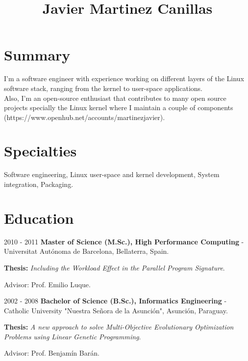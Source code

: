 \documentclass{simplecv}
\begin{document}

\title{Javier Martinez Canillas}

\maketitle

\section{Summary}

I'm a software engineer with experience working on different layers of the Linux software stack,
ranging from the kernel to user-space applications.\\

Also, I'm an open-source enthusiast that contributes to many open source projects specially the
Linux kernel where I maintain a couple of components (https://www.openhub.net/accounts/martinezjavier).

\section{Specialties}

Software engineering, Linux user-space and kernel development, System integration, Packaging.

\section{Education}

\begin{topic}

\item[2010 - 2011] {\bf Master of Science (M.Sc.), High Performance Computing} - Universitat Autónoma de Barcelona, Bellaterra, Spain. 

{\bf Thesis:} \emph{Including the Workload Effect in the Parallel Program Signature}. 

Advisor: Prof. Emilio Luque.

\item[2002 - 2008] {\bf Bachelor of Science (B.Sc.), Informatics Engineering} - Catholic University "Nuestra Señora de la Asunción", Asunción, Paraguay. 

{\bf Thesis:} \emph{A new approach to solve Multi-Objective Evolutionary Optimization Problems using Linear Genetic Programming}. 

Advisor: Prof. Benjamín Barán.

\end{topic}
\end{document}
